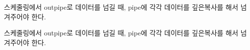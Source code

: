 
\begin{DoxyRefList}
\item[\label{bug__bug000001}%
\hypertarget{bug__bug000001}{}%
Member \hyperlink{classBASICCELL_a2e910313cdad1651908cca08f89be64c}{B\+A\+S\+I\+C\+C\+E\+L\+L\+:\+:scheduling} (void $\ast$arg)]스케줄링에서 outpipe로 데이터를 넘길 때, pipe에 각각 데이터를 깊은복사를 해서 넘겨주어야 한다.  
\item[\label{bug__bug000002}%
\hypertarget{bug__bug000002}{}%
Member \hyperlink{classUNIONCELL_a0179dad91d30e7bca318bb7e3b4a4995}{U\+N\+I\+O\+N\+C\+E\+L\+L\+:\+:scheduling} (void $\ast$arg)]스케줄링에서 outpipe로 데이터를 넘길 때, pipe에 각각 데이터를 깊은복사를 해서 넘겨주어야 한다. 
\end{DoxyRefList}